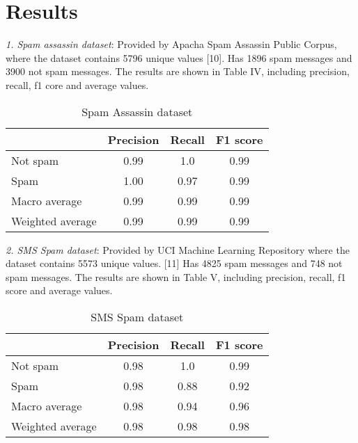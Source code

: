 ﻿\section{Results}

\indent \textit{1. Spam assassin dataset}: Provided by Apacha Spam Assassin Public Corpus, where the dataset contains 5796 unique values [10]. Has 1896 spam messages and 3900 not spam messages. The results are shown in Table IV, including precision, recall, f1 core and average values.
\begin{table}[H]
    \begin{center}
    \label{spam_assassin}
    \caption{Spam Assassin dataset}
    \small
        \begin{tabularx}{\columnwidth}{| X | c | c | c |}
            \hline
             & Precision & Recall & F1 score \\
            \hline
            Not spam & 0.99 & 1.0 & 0.99 \\
            \hline
            Spam & 1.00 & 0.97 & 0.99 \\
            \hline
            Macro average & 0.99 & 0.99 & 0.99 \\
            \hline
            Weighted average & 0.99 & 0.99 & 0.99 \\
            \hline
        \end{tabularx}
    \end{center}
\end{table}

\indent \textit{2. SMS Spam dataset}: Provided by UCI Machine Learning Repository where the dataset contains 5573 unique values. [11] Has 4825 spam messages and 748 not spam messages. The results are shown in Table V, including precision, recall, f1 score and average values.
\begin{table}[H]
    \begin{center}
    \label{sms_spam_dataset}
    \caption{SMS Spam dataset}
    \small
        \begin{tabularx}{\columnwidth}{| X | c | c | c |}
            \hline
             & Precision & Recall & F1 score \\
            \hline
            Not spam & 0.98 & 1.0 & 0.99 \\
            \hline
            Spam & 0.98 & 0.88 & 0.92 \\
            \hline
            Macro average & 0.98 & 0.94 & 0.96 \\
            \hline
            Weighted average & 0.98 & 0.98 & 0.98 \\
            \hline
        \end{tabularx}
    \end{center}
\end{table}

